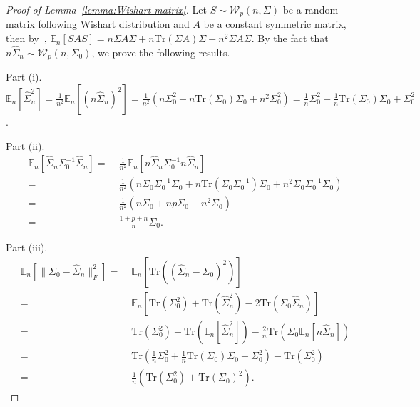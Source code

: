 \documentclass[11pt]{article}
\def\E {\mathbb{E}}
\def\tr{\mathrm{Tr}}
\newcommand{\mc}{\mathcal}
\newcommand{\wh}{\widehat}
\begin{document}
\begin{proof}[Proof of Lemma~\ref{lemma:Wishart-matrix}]
    Let $S\sim \mc W_p(n, \Sigma)$ be a random matrix following Wishart distribution and $A$ be a constant symmetric matrix, then by~\citet[Theorem 3.3.15 (ii)]{ref:gupta2018matrix}, $\E_n [SAS]=n\Sigma A \Sigma+n\tr(\Sigma A)\Sigma+n^2 \Sigma A \Sigma$. By the fact that $n\wh\Sigma_n\sim \mc W_p(n, \Sigma_0)$, we prove the following results.

   Part (i). $\E_n [\wh \Sigma_n^2] = \frac{1}{n^2}\E_n [(n\wh\Sigma_n)^2] = \frac{1}{n^2}(n\Sigma_0^2+n\tr(\Sigma_0)\Sigma_0+n^2\Sigma_0^2)=\frac{1}{n}\Sigma_0^2+\frac{1}{n}\tr(\Sigma_0)\Sigma_0+\Sigma_0^2$.

     Part (ii). 
    \begin{align*}
        \E_n [\wh \Sigma_n \Sigma_0^{-1} \wh \Sigma_n] =\;& \frac{1}{n^2} \E_n [n \wh \Sigma_n \Sigma_0^{-1} n \wh \Sigma_n]\\ =\;& \frac{1}{n^2}(n\Sigma_0\Sigma_0^{-1}\Sigma_0+n\tr(\Sigma_0\Sigma_0^{-1})\Sigma_0+n^2\Sigma_0\Sigma_0^{-1}\Sigma_0)\\
        =\;& \frac{1}{n^2}(n\Sigma_0+np\Sigma_0+n^2\Sigma_0)
        \\=\;&\frac{1+p+n}{n}\Sigma_0.
    \end{align*}
    

      Part (iii). 
    \begin{align*}
        \E_n [\|\Sigma_0-\wh\Sigma_n\|_F^2] = \;&\E_n \left[\tr\left((\wh\Sigma_n-\Sigma_0)^2\right)\right]\\=\;&\E_n [\tr(\Sigma_0^2)+\tr(\wh \Sigma_n^2)-2\tr(\Sigma_0\wh\Sigma_n)] 
        \\=\;& \tr(\Sigma_0^2) +\tr(\E_n[\wh\Sigma_n^2]) - \frac{2}{n}\tr(\Sigma_0\E_n[n\wh\Sigma_n])\\
        =\;& \tr\left(\frac{1}{n}\Sigma_0^2+\frac{1}{n}\tr(\Sigma_0)\Sigma_0+\Sigma_0^2\right)-\tr(\Sigma_0^2)
        \\=\;& \frac{1}{n}(\tr(\Sigma_0^2)+\tr(\Sigma_0)^2).
    \end{align*}


\end{proof}
\end{document}
